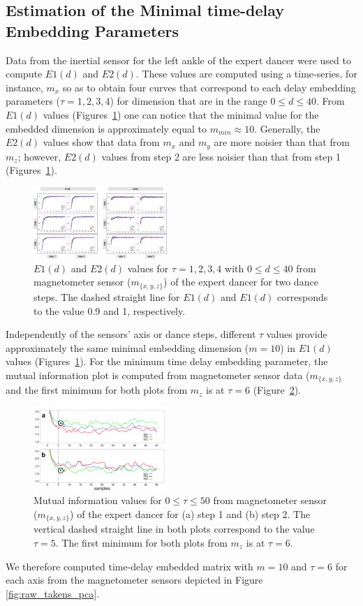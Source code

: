 \documentclass[10pt,journal,compsoc]{IEEEtran}
\begin{document}
\subsection{Estimation of the Minimal time-delay Embedding Parameters}
Data from the inertial sensor for the left ankle of the expert 
dancer were used to compute $E1(d)$ and $E2(d)$. These 
values are computed using a time-series, for instance, $m_x$
so as to obtain four curves that correspond to each delay 
embedding parameters ($\tau=1,2,3,4$) for dimension that 
are in the range $0 \leq d \leq 40$. From $E1(d)$ values (Figures~\ref{fig:e1e2exp}) 
one can notice that the minimal value for the embedded 
dimension is approximately equal to $m_{min} \approx 10$. Generally, 
the $E2(d)$ values show that data from $m_x$ and $m_y$ 
are more noisier than that from $m_z$; however, $E2(d)$ values 
from step 2 are less noisier than that from step 1  (Figures~\ref{fig:e1e2exp}).
\begin{figure}[!htb]
\centering    
\includegraphics[width=0.45\textwidth]{e1e2_values_expert}
\caption[PA]{$E1(d)$ and $E2(d)$ values for $\tau=1,2,3,4$ with $0 \leq d \leq 40$
from magnetometer sensor ($m_{ \{ x,y,z \} }$) of the expert dancer for two dance steps.
The dashed straight line for $E1(d)$ and $E1(d)$ corresponds to the value 0.9 and 1, respectively.}
\label{fig:e1e2exp}
\end{figure}
Independently of the sensors' axis or dance steps, different $\tau$ 
values provide approximately the same minimal embedding 
dimension ($m=10$) in $E1(d)$ values (Figures~\ref{fig:e1e2exp}). For the 
minimum time delay embedding parameter, the mutual 
information plot is computed from magnetometer sensor 
data ($m_{ \{ x,y,z \} }$ and the first minimum for both plots from 
$m_z$ is at $\tau=6$ (Figure~\ref{fig:miplots}).
\begin{figure}[!htb]
\centering    
\includegraphics[width=0.45\textwidth]{miplots01}
\caption[PA]{
Mutual information values for $0 \leq \tau \leq 50$ from magnetometer sensor 
($m_{ \{ x,y,z \} }$) of the expert dancer for (a) step 1 and (b) step 2.
The vertical dashed straight line in both plots correspond to the value $\tau=5$.
The first minimum for both plots from $m_z$ is at $\tau=6$.}
\label{fig:miplots}
\end{figure}
We therefore computed time-delay 
embedded matrix with $m=10$ and $\tau = 6$ for each 
axis from the magnetometer sensors depicted in Figure \ref{fig:raw_takens_pca}.
\end{document}
